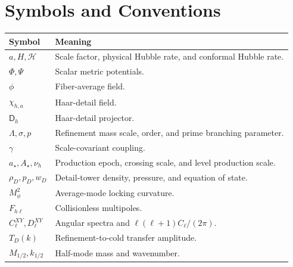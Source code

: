 \chapter*{Symbols and Conventions}
\begin{longtable}{@{}P{0.22\textwidth}P{0.70\textwidth}@{}}\toprule Symbol & Meaning\\\midrule $a,H,\mathcal H$ & Scale factor, physical Hubble rate, and conformal Hubble rate.\\ $\Phi,\Psi$ & Scalar metric potentials.\\ $\phi$ & Fiber-average field.\\ $\chi_{h,a}$ & Haar-detail field.\\ $\mathsf D_h$ & Haar-detail projector.\\ $\Lambda,\sigma,p$ & Refinement mass scale, order, and prime branching parameter.\\ $\gamma$ & Scale-covariant coupling.\\ $a_\star,A_\star,\nu_h$ & Production epoch, crossing scale, and level production scale.\\ $\rho_D,p_D,w_D$ & Detail-tower density, pressure, and equation of state.\\ $M_\phi^2$ & Average-mode locking curvature.\\ $F_{h\ell}$ & Collisionless multipoles.\\ $C_\ell^{XY},D_\ell^{XY}$ & Angular spectra and $\ell(\ell+1)C_\ell/(2\pi)$.\\ $T_D(k)$ & Refinement-to-cold transfer amplitude.\\ $M_{1/2},k_{1/2}$ & Half-mode mass and wavenumber.\\\bottomrule\end{longtable}
